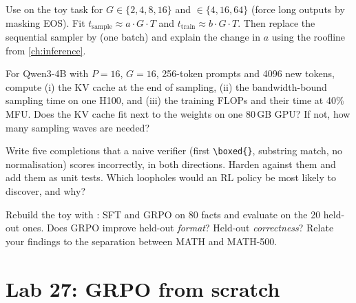 \begin{exercise}
Use  on the toy task for $G\in\{2,4,8,16\}$ and
$\in\{4,16,64\}$ (force long outputs by masking EOS). Fit
$t_{\text{sample}}\approx a\cdot G\cdot T$ and $t_{\text{train}}\approx b\cdot G\cdot T$. Then
replace the sequential sampler by  (one batch) and explain the change
in $a$ using the roofline from \cref{ch:inference}.
\end{exercise}

\begin{exercise}
For Qwen3-4B with $P=16$, $G=16$, 256-token prompts and 4096 new tokens, compute (i) the KV
cache at the end of sampling, (ii) the bandwidth-bound sampling time on one H100, and (iii) the
training FLOPs and their time at 40\% MFU. Does the KV cache fit next to the weights on one
80\,GB GPU? If not, how many sampling waves are needed?
\end{exercise}

\begin{exercise}
Write five completions that a naive verifier (first \verb|\boxed{}|, substring
match, no normalisation) scores incorrectly, in both directions. Harden
 against them and add them as unit tests. Which loopholes would an RL
policy be most likely to discover, and why?
\end{exercise}

\begin{exercise}
Rebuild the toy with : SFT and GRPO on 80 facts and
evaluate on the 20 held-out ones. Does GRPO improve held-out \emph{format}? Held-out
\emph{correctness}? Relate your findings to the separation between MATH and MATH-500.
\end{exercise}

\section{Lab 27: GRPO from scratch}\label{sec:grpo:lab}

